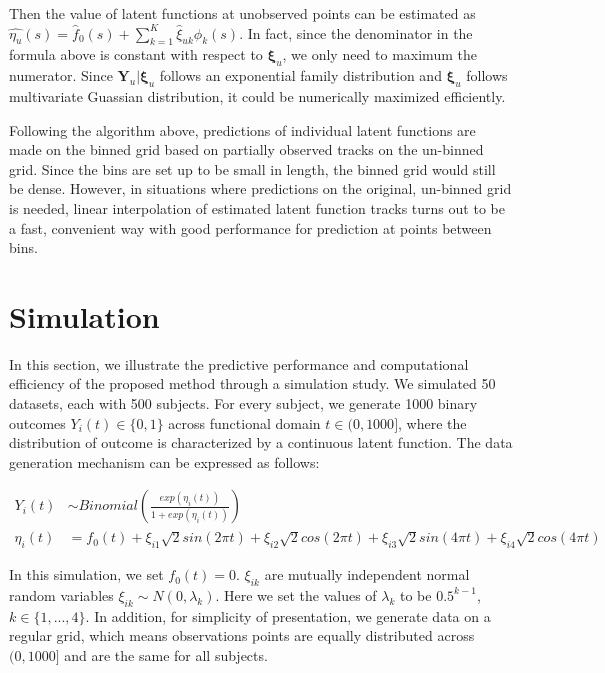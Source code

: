 \documentclass[
  11pt,
]{article}
\begin{document}
Then the value of latent functions at unobserved points can be estimated
as
\(\hat{\eta_u}(s)=\hat{f}_0(s)+\sum_{k=1}^K\hat{\xi}_{uk}{\phi}_k(s)\).
In fact, since the denominator in the formula above is constant with
respect to \(\boldsymbol{\xi}_u\), we only need to maximum the
numerator. Since \(\boldsymbol{Y}_u|\boldsymbol{\xi}_u\) follows an
exponential family distribution and \(\boldsymbol{\xi}_u\) follows
multivariate Guassian distribution, it could be numerically maximized
efficiently.

Following the algorithm above, predictions of individual latent
functions are made on the binned grid based on partially observed tracks
on the un-binned grid. Since the bins are set up to be small in length,
the binned grid would still be dense. However, in situations where
predictions on the original, un-binned grid is needed, linear
interpolation of estimated latent function tracks turns out to be a
fast, convenient way with good performance for prediction at points
between bins.

\hypertarget{simulation}{%
\section{Simulation}\label{simulation}}

In this section, we illustrate the predictive performance and
computational efficiency of the proposed method through a simulation
study. We simulated 50 datasets, each with 500 subjects. For every
subject, we generate 1000 binary outcomes \(Y_i(t) \in \{0, 1\}\) across
functional domain \(t \in (0, 1000]\), where the distribution of outcome
is characterized by a continuous latent function. The data generation
mechanism can be expressed as follows:

\[\begin{aligned}
Y_i(t) & \sim Binomial(\frac{exp(\eta_i(t))}{1+exp(\eta_i(t))}) \\
\eta_i(t) &= f_0(t)+ \xi_{i1}\sqrt{2}sin(2\pi t)+\xi_{i2}\sqrt{2}cos(2\pi t)+\xi_{i3}\sqrt{2}sin(4\pi t)+\xi_{i4}\sqrt{2}cos(4\pi t)
\end{aligned}\]

In this simulation, we set \(f_0(t) = 0\). \(\xi_{ik}\) are mutually
independent normal random variables \(\xi_{ik}\sim N(0, \lambda_k)\).
Here we set the values of \(\lambda_k\) to be \(0.5^{k-1}\),
\(k \in \{1,..., 4\}\). In addition, for simplicity of presentation, we
generate data on a regular grid, which means observations points are
equally distributed across \((0, 1000]\) and are the same for all
subjects.
\end{document}
